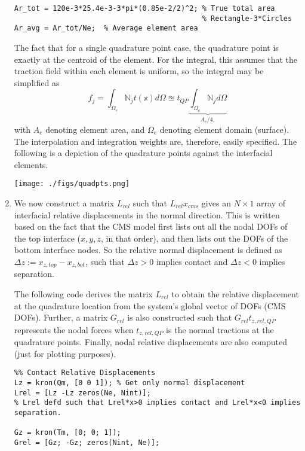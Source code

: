 \documentclass[11pt]{article}
\begin{document}
\begin{enumerate}
\begin{verbatim}
Ar_tot = 120e-3*25.4e-3-3*pi*(0.85e-2/2)^2; % True total area
                                            % Rectangle-3*Circles
Ar_avg = Ar_tot/Ne;  % Average element area
\end{verbatim}
The fact that for a single quadrature point case, the quadrature point is exactly at the centroid of the element.
For the integral, this assumes that the traction field within each element is uniform, so the integral may be simplified as
$$ f_j = \int_{\Omega_e} \mathbb{N}_j t(\mathbb{x}) d\Omega \approxeq t_{QP} \underbrace{\int_{\Omega_e} \mathbb{N}_j d\Omega}_{A_e/4,} $$
with \(A_e\) denoting element area, and \(\Omega_e\) denoting element domain (surface).
The interpolation and integration weights are, therefore, easily specified.
The following is a depiction of the quadrature points against the interfacial elements.
\begin{center}
\texttt{[image: ./figs/quadpts.png]}
\end{center}
\item We now construct a matrix \(L_{rel}\) such that \(L_{rel}x_{cms}\) gives an \(N\times 1\) array of interfacial relative displacements in the normal direction.
This is written based on the fact that the CMS model first lists out all the nodal DOFs of the top interface (\(x, y, z\), in that order), and then lists out the DOFs of the bottom interface nodes.
So the relative normal displacement is defined as \(\Delta z:=x_{z,top}-x_{z,bot}\), such that \(\Delta z>0\) implies contact and \(\Delta z<0\) implies separation.

The following code derives the matrix \(L_{rel}\) to obtain the relative displacement at the quadrature location from the system's global vector of DOFs (CMS DOFs).
Further, a matrix \(G_{rel}\) is also constructed such that \(G_{rel} t_{z,rel,QP}\) represents the nodal forces when \(t_{z,rel,QP}\) is the normal tractions at the quadrature points.
Finally, nodal relative displacements are also computed (just for plotting purposes).
\begin{verbatim}
%% Contact Relative Displacements
Lz = kron(Qm, [0 0 1]); % Get only normal displacement
Lrel = [Lz -Lz zeros(Ne, Nint)];
% Lrel defd such that Lrel*x>0 implies contact and Lrel*x<0 implies separation.

Gz = kron(Tm, [0; 0; 1]);
Grel = [Gz; -Gz; zeros(Nint, Ne)];


\end{verbatim}
\end{enumerate}
\end{document}
